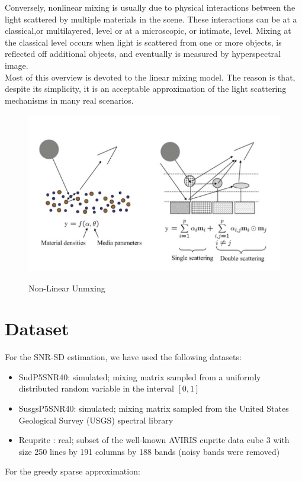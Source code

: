 \documentclass[12pt]{svproc}
\begin{document}
Conversely, nonlinear mixing is usually due to physical interactions between the light scattered by multiple materials in the scene. These interactions can be at a classical,or multilayered, level or at a microscopic, or intimate, level. Mixing at the classical level occurs when light is scattered from one or more objects, is reflected off additional objects, and eventually is measured by hyperspectral image.\\
 	
Most of this overview is devoted to the linear mixing model.
The reason is that, despite its simplicity, it is an acceptable
approximation of the light scattering mechanisms in many real
scenarios.


\begin{figure}{}
	\includegraphics[width=0.7\linewidth, height=7cm]{Picture3} 
	\label{fig:subim1}
	\centering
	\caption{Non-Linear Unmxing}
\end{figure}

 

\section{Dataset}
For the SNR-SD estimation, we have used the following datasets:
\begin{itemize}
	\item SudP5SNR40: simulated; mixing matrix sampled from a uniformly distributed random variable in the interval $[0,1]$
	\item SusgsP5SNR40: simulated; mixing matrix sampled from the United States Geological Survey (USGS) spectral library
	\item Rcuprite : real; subset of the well-known AVIRIS cuprite data cube 3 with size 250 lines by 191 columns by 188 bands (noisy bands were removed)
\end{itemize}
For the greedy sparse approximation:
\end{document}
